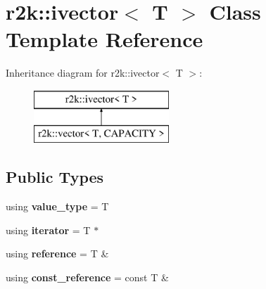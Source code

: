 \hypertarget{classr2k_1_1ivector}{}\section{r2k\+:\+:ivector$<$ T $>$ Class Template Reference}
\label{classr2k_1_1ivector}
Inheritance diagram for r2k\+:\+:ivector$<$ T $>$\+:\begin{figure}[H]
\begin{center}
\leavevmode
\includegraphics[height=2.000000cm]{classr2k_1_1ivector}
\end{center}
\end{figure}
\subsection*{Public Types}
\begin{DoxyCompactItemize}
\item 
\mbox{\label{classr2k_1_1ivector_a3a4a70de708c8da5839e8ee768c98b5f}} 
using {\bfseries value\+\_\+type} = T
\item 
\mbox{\label{classr2k_1_1ivector_ace2102b41173217afd12cea873393cf2}} 
using {\bfseries iterator} = T $\ast$
\item 
\mbox{\label{classr2k_1_1ivector_a516031d9abc36627e05a7291819ae73b}} 
using {\bfseries reference} = T \&
\item 
\mbox{\label{classr2k_1_1ivector_ad2d0d8eec97c5e73db7afcb5dc3d444a}} 
using {\bfseries const\+\_\+reference} = const T \&
\end{DoxyCompactItemize}

